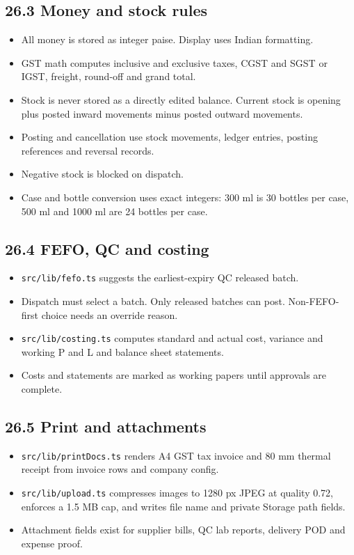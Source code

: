 \documentclass[11pt]{article}
\begin{document}
\subsection{26.3 Money and stock rules}
\begin{itemize}[leftmargin=*,itemsep=2pt,topsep=2pt]
\item All money is stored as integer paise. Display uses Indian formatting.
\item GST math computes inclusive and exclusive taxes, CGST and SGST or IGST, freight, round-off and grand total.
\item Stock is never stored as a directly edited balance. Current stock is opening plus posted inward movements minus posted outward movements.
\item Posting and cancellation use stock movements, ledger entries, posting references and reversal records.
\item Negative stock is blocked on dispatch.
\item Case and bottle conversion uses exact integers: 300 ml is 30 bottles per case, 500 ml and 1000 ml are 24 bottles per case.
\end{itemize}
\subsection{26.4 FEFO, QC and costing}
\begin{itemize}[leftmargin=*,itemsep=2pt,topsep=2pt]
\item \texttt{src/lib/fefo.ts} suggests the earliest-expiry QC released batch.
\item Dispatch must select a batch. Only released batches can post. Non-FEFO-first choice needs an override reason.
\item \texttt{src/lib/costing.ts} computes standard and actual cost, variance and working P and L and balance sheet statements.
\item Costs and statements are marked as working papers until approvals are complete.
\end{itemize}
\subsection{26.5 Print and attachments}
\begin{itemize}[leftmargin=*,itemsep=2pt,topsep=2pt]
\item \texttt{src/lib/printDocs.ts} renders A4 GST tax invoice and 80 mm thermal receipt from invoice rows and company config.
\item \texttt{src/lib/upload.ts} compresses images to 1280 px JPEG at quality 0.72, enforces a 1.5 MB cap, and writes file name and private Storage path fields.
\item Attachment fields exist for supplier bills, QC lab reports, delivery POD and expense proof.
\end{itemize}
\end{document}
